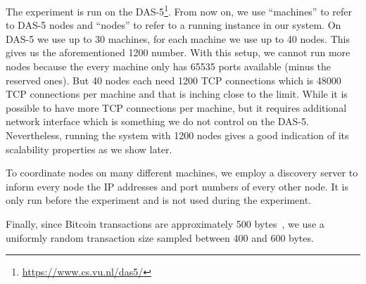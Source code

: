 The experiment is run on the DAS-5\footnote{\url{https://www.cs.vu.nl/das5/}}.
From now on, we use ``machines'' to refer to DAS-5 nodes and ``nodes'' to refer to a running instance in our system.
On DAS-5 we use up to 30 machines, for each machine we use up to 40 nodes.
This gives us the aforementioned 1200 number.
With this setup, we cannot run more nodes because the every machine only has 65535 ports available (minus the reserved ones).
But 40 nodes each need 1200 TCP connections which is 48000 TCP connections per machine and that is inching close to the limit.
While it is possible to have more TCP connections per machine,
but it requires additional network interface which is something we do not control on the DAS-5.
Nevertheless, running the system with 1200 nodes gives a good indication of its scalability properties as we show later.

To coordinate nodes on many different machines,
we employ a discovery server to inform every node the IP addresses and port numbers of every other node.
It is only run before the experiment and is not used during the experiment.

Finally, since Bitcoin transactions are approximately 500 bytes~\cite{txsize},
we use a uniformly random transaction size sampled between 400 and 600 bytes.